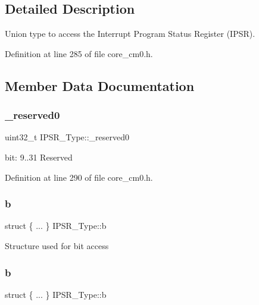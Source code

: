 \subsection{Detailed Description}
Union type to access the Interrupt Program Status Register (I\+P\+SR). 

Definition at line 285 of file core\+\_\+cm0.\+h.



\subsection{Member Data Documentation}
\mbox{\label{union_i_p_s_r___type_ad2eb0a06de4f03f58874a727716aa9aa}} 
\subsubsection{\texorpdfstring{\+\_\+reserved0}{\_reserved0}}
{\footnotesize\ttfamily uint32\+\_\+t I\+P\+S\+R\+\_\+\+Type\+::\+\_\+reserved0}

bit\+: 9..31 Reserved 

Definition at line 290 of file core\+\_\+cm0.\+h.

\mbox{\label{union_i_p_s_r___type_a81a5d310f19361bb4b17e7411650fdd9}} 
\subsubsection{\texorpdfstring{b}{b}\hspace{0.1cm}{\footnotesize\ttfamily [1/7]}}
{\footnotesize\ttfamily struct \{ ... \}   I\+P\+S\+R\+\_\+\+Type\+::b}

Structure used for bit access \mbox{\label{union_i_p_s_r___type_add0d6497bd50c25569ea22b48a03ec50}} 
\subsubsection{\texorpdfstring{b}{b}\hspace{0.1cm}{\footnotesize\ttfamily [2/7]}}
{\footnotesize\ttfamily struct \{ ... \}   I\+P\+S\+R\+\_\+\+Type\+::b}

